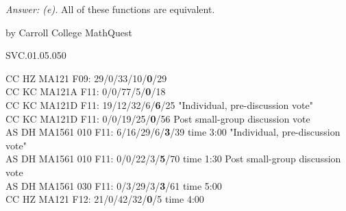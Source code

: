 {\it Answer: (e).} All of these functions are equivalent.

\medskip

by Carroll College MathQuest

SVC.01.05.050


CC HZ MA121 F09: 29/0/33/10/{\bf0}/29  \\
CC KC MA121A F11: 0/0/77/5/{\bf0}/18  \\
CC KC MA121D F11: 19/12/32/6/{\bf6}/25 "Individual, pre-discussion vote" \\
CC KC MA121D F11: 0/0/19/25/{\bf0}/56 Post small-group discussion vote \\
AS DH MA1561 010 F11: 6/16/29/6/{\bf3}/39 time 3:00 "Individual, pre-discussion vote" \\
AS DH MA1561 010 F11: 0/0/22/3/{\bf5}/70 time 1:30 Post small-group discussion vote \\
AS DH MA1561 030 F11: 0/3/29/3/{\bf3}/61 time 5:00  \\
CC HZ MA121 F12: 21/0/42/32/{\bf0}/5 time 4:00  \\
